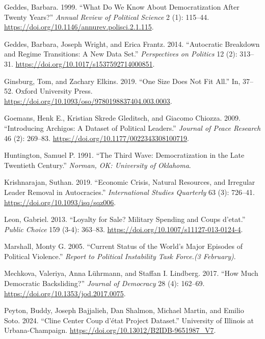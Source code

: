 \documentclass[
  12pt,
]{report}
\newlength{\cslhangindent}
\newenvironment{CSLReferences}[2] %
 {\begin{list}{}{%
  \setlength{\itemindent}{0pt}
  \setlength{\leftmargin}{0pt}
  \setlength{\parsep}{0pt}
  \ifodd #1
   \setlength{\leftmargin}{\cslhangindent}
   \setlength{\itemindent}{-1\cslhangindent}
  \fi
  \setlength{\itemsep}{#2\baselineskip}}}
 {\end{list}}
\begin{document}
\begin{CSLReferences}{1}{0}
Geddes, Barbara. 1999. {``What Do We Know About Democratization After
Twenty Years?''} \emph{Annual Review of Political Science} 2 (1):
115--44. \url{https://doi.org/10.1146/annurev.polisci.2.1.115}.

Geddes, Barbara, Joseph Wright, and Erica Frantz. 2014. {``Autocratic
Breakdown and Regime Transitions: A New Data Set.''} \emph{Perspectives
on Politics} 12 (2): 313--31.
\url{https://doi.org/10.1017/s1537592714000851}.

Ginsburg, Tom, and Zachary Elkins. 2019. {``One Size Does Not Fit
All.''} In, 37--52. Oxford University Press.
\url{https://doi.org/10.1093/oso/9780198837404.003.0003}.

Goemans, Henk E., Kristian Skrede Gleditsch, and Giacomo Chiozza. 2009.
{``Introducing Archigos: A Dataset of Political Leaders.''}
\emph{Journal of Peace Research} 46 (2): 269--83.
\url{https://doi.org/10.1177/0022343308100719}.

Huntington, Samuel P. 1991. {``The Third Wave: Democratization in the
Late Twentieth Century.''} \emph{Norman, OK: University of Oklahoma}.

Krishnarajan, Suthan. 2019. {``Economic Crisis, Natural Resources, and
Irregular Leader Removal in Autocracies.''} \emph{International Studies
Quarterly} 63 (3): 726--41. \url{https://doi.org/10.1093/isq/sqz006}.

Leon, Gabriel. 2013. {``Loyalty for Sale? Military Spending and Coups
d{'}etat.''} \emph{Public Choice} 159 (3-4): 363--83.
\url{https://doi.org/10.1007/s11127-013-0124-4}.

Marshall, Monty G. 2005. {``Current Status of the World's Major Episodes
of Political Violence.''} \emph{Report to Political Instability Task
Force.(3 February)}.

Mechkova, Valeriya, Anna Lührmann, and Staffan I. Lindberg. 2017. {``How
Much Democratic Backsliding?''} \emph{Journal of Democracy} 28 (4):
162--69. \url{https://doi.org/10.1353/jod.2017.0075}.

Peyton, Buddy, Joseph Bajjalieh, Dan Shalmon, Michael Martin, and Emilio
Soto. 2024. {``Cline Center Coup d{'}état Project Dataset.''} University
of Illinois at Urbana-Champaign.
\url{https://doi.org/10.13012/B2IDB-9651987_V7}.


\end{CSLReferences}
\end{document}
